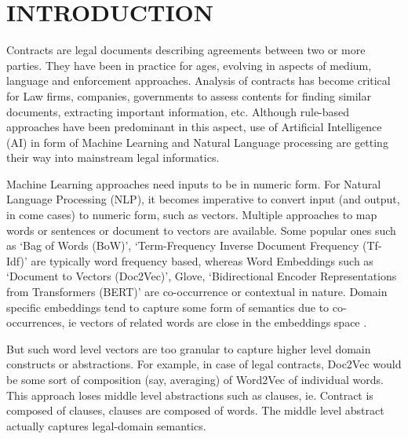 \documentclass[9pt,academicons]{article}
\begin{document}
%




\section{INTRODUCTION}

Contracts are legal documents describing agreements between two or more parties. They have been in practice for ages, evolving in aspects of medium, language and enforcement approaches. Analysis of contracts has become critical for Law firms, companies, governments to assess contents for finding similar documents, extracting important information, etc. Although rule-based approaches have been predominant in this aspect, use of Artificial Intelligence (AI) in form of Machine Learning and Natural Language processing are getting their way into mainstream legal informatics.

Machine Learning approaches need inputs to be in numeric form. For Natural Language Processing (NLP), it becomes imperative 
to convert input (and output, in come cases) to numeric form, such as vectors. Multiple approaches to map words or sentences or document to vectors are available. Some popular ones such as `Bag of Words (BoW)', `Term-Frequency Inverse Document Frequency (Tf-Idf)' are typically word frequency based, whereas Word Embeddings such as `Document to Vectors (Doc2Vec)', Glove, `Bidirectional Encoder Representations from Transformers (BERT)' are co-occurrence or contextual in nature. Domain specific embeddings tend to capture some form of semantics due to co-occurrences, ie vectors of related words are close in the embeddings space \cite{Doc2VecSurvey}.

But such word level vectors are too granular to capture higher level domain constructs or abstractions. For example, in case of legal contracts, Doc2Vec would be some sort of composition (say, averaging) of Word2Vec of individual words. This approach loses middle level abstractions such as clauses, ie. Contract is composed of clauses, clauses are composed of words. The middle level abstract actually captures legal-domain semantics.
\end{document}
